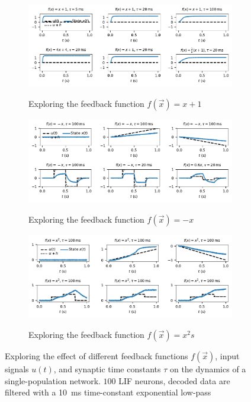\documentclass[10pt,letterpaper,oneside]{article}
\begin{document}
\begin{figure}
	\centering
	\begin{subfigure}{\textwidth}
		\centering
		\includegraphics{media/fxp1_example_small.pdf}\\[-0.25cm]
		\caption{Exploring the feedback function $f(\vec x) = x + 1$}
		\label{fig:dynamics_example_a}\vspace{0.25cm}
	\end{subfigure}
	\begin{subfigure}{\textwidth}
		\centering
		\includegraphics{media/fmx_example_small.pdf}\\[-0.25cm]
		\caption{Exploring the feedback function $f(\vec x) = -x$}
		\label{fig:dynamics_example_b}\vspace{0.25cm}
	\end{subfigure}
	\begin{subfigure}{\textwidth}
		\centering
		\includegraphics{media/fxs_example_small.pdf}\\[-0.25cm]
		\caption{Exploring the feedback function $f(\vec x) = x^2s$}
		\label{fig:dynamics_example_c}\vspace{0.25cm}
	\end{subfigure}
	\caption{Exploring the effect of different feedback functions $f(\vec x)$, input signals $u(t)$, and synaptic time constants $\tau$ on the dynamics of a single-population network. $100$ LIF neurons, decoded data are filtered with a \SI{10}{\milli\second} time-constant exponential low-pass}
	\label{fig:dynamics_example}
\end{figure}
\end{document}

